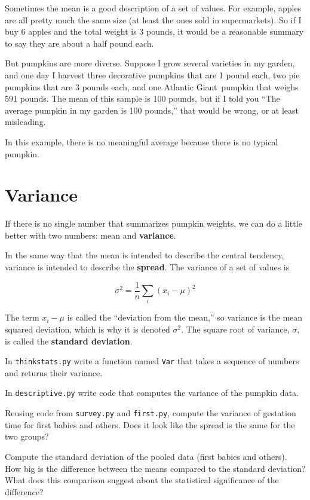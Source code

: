 \documentclass[12pt]{book}
\begin{document}
Sometimes the mean is a good description of a set of values.  For
example, apples are all pretty much the same size (at least the ones
sold in supermarkets).  So if I buy 6 apples and the total weight is 3
pounds, it would be a reasonable summary to say they are about a half
pound each.

But pumpkins are more diverse.  Suppose I grow several varieties in my
garden, and one day I harvest three decorative pumpkins that are 1
pound each, two pie pumpkins that are 3 pounds each, and one Atlantic
Giant\textregistered~pumpkin that weighs 591 pounds.  The mean of
this sample is 100 pounds, but if I told you ``The average pumpkin
in my garden is 100 pounds,'' that would be wrong, or at least
misleading.

In this example, there is no meaningful average because
there is no typical pumpkin.

\section{Variance}

If there is no single number that summarizes pumpkin weights,
we can do a little better with two numbers: mean and {\bf variance}.

In the same way that the mean is intended to describe the central
tendency, variance is intended to describe the {\bf spread}.
The variance of a set of values is

\[ \sigma^2 = \frac{1}{n} \sum_i (x_i - \mu)^2 \]

The term $x_i - \mu$ is called the ``deviation from the mean,'' so
variance is the mean squared deviation, which is why it is denoted
$\sigma^2$.  The square root of variance, $\sigma$, is called the {\bf
  standard deviation}.

\begin{ex}
In {\tt thinkstats.py} write a function named {\tt Var} that takes a
sequence of numbers and returns their variance.

In {\tt descriptive.py} write code that
computes the variance of the pumpkin data.
\end{ex}

\begin{ex}
Reusing code from {\tt survey.py} and {\tt first.py}, compute the
variance of gestation time for first babies and others.  Does it look
like the spread is the same for the two groups?
\end{ex}

\begin{ex}
Compute the standard deviation of the pooled data (first babies
and others).  How big is the difference between the
means compared to the standard deviation?  What does this comparison
suggest about the statistical significance of the difference?
\end{ex}
\end{document}
